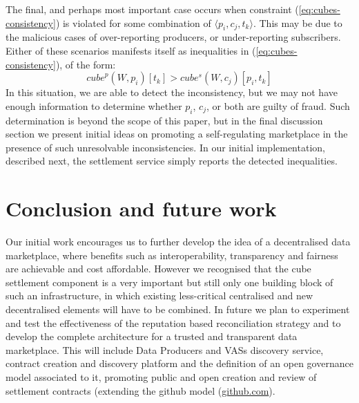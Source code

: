 \documentclass[chi_draft]{sigchi}
\begin{document}
{The final, and perhaps most important case occurs when constraint (\ref{eq:cubes-consistency}) is violated for some combination of $\langle p_i, c_j, t_k \rangle$.
This may be due to the malicious cases of over-reporting producers, or under-reporting subscribers.
%
Either of these  scenarios manifests itself as inequalities in (\ref{eq:cubes-consistency}), of the form:
\begin{equation}\label{eq:inconsistencies}
\mathit{cube}^p(W, p_i)[t_k] > \mathit{cube^s}(W, c_j)[p_i, t_k]
\end{equation}
In this situation, we are able to detect the inconsistency, but we may not have enough information to determine whether $p_i$, $c_j$, or both are guilty of fraud.
Such determination is beyond the scope of this paper, but in the final discussion section we present initial ideas on promoting a self-regulating marketplace in the presence of such unresolvable inconsistencies.
%
In our initial implementation, described next, the settlement service simply reports the detected inequalities.



\section{Conclusion and future work}
Our initial work encourages us to further develop the idea of a decentralised data marketplace, where benefits such as interoperability, transparency and fairness are achievable and cost affordable. However we recognised that the cube settlement component is a very important but still only one building block of such an infrastructure, in which existing less-critical centralised and new decentralised elements will have to be combined. In future we plan to experiment and test the effectiveness of the reputation based reconciliation strategy and to develop the complete architecture for a trusted and transparent data marketplace. This will include Data Producers and VASs discovery service, contract creation and discovery platform and the definition of an open governance model associated to it, promoting public and open creation and review of settlement contracts (extending the github model (\url{github.com}).







}
\end{document}

